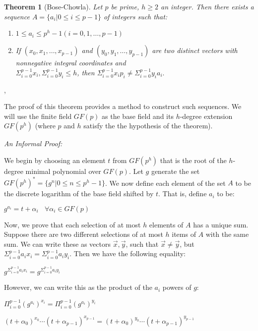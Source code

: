 \documentclass[12pt,a4paper,titlepage]{article}
\begin{document}
\newtheorem{theorem}{Theorem}[section]
\begin{theorem}[Bose-Chowla]
	Let $p$ be prime, $h \ge 2$ an integer. Then there exists a sequence $A = \{ a_i | 0 \le i \le p-1 \} $ of integers such that: 
	\begin{enumerate}
		\item $ 1 \le a_i \le p^h - 1   (i = 0, 1, \dots, p-1)$
		\item If $(x_0, x_1, \dots, x_{p-1})$ and $ ( y_0,y_1, \dots, y_{p-1} )$ are two distinct vectors with nonnegative integral coordinates and \\ 
			$ \Sigma_{i=0}^{p-1} x_i , \Sigma_{i=0}^{p-1} y_i \le h$, then  $\Sigma_{i=0}^{p-1} x_i p_i \ne \Sigma_{i=0}^{p-1} y_i a_i .$
	\end{enumerate}
\end{theorem}
\cite{Chor84:1}, \cite{Bose:2}
\par The proof of this theorem provides a method to construct such sequences.   We will use the finite field $GF(p)$ as the base field and its $h$-degree extension $GF(p^h)$ (where $p$ and $h$ satisfy the the hypothesis of the theorem).

\textit{An Informal Proof: }

\par We begin by choosing an element $t$ from $GF(p^h)$ that is the root of the $h$-degree minimal polynomial over $GF(p)$. Let $g$ generate the set $GF(p^h)^* = \{g^n | 0 \le n \le p^h - 1 \}$. We now define each element of the set $A$ to be the discrete logarithm of the base field shifted by $t$. That is, define $a_i$ to be: \\ \centerline{$ g^{a_i} = t + \alpha_i \ \  \ \  \forall\alpha_i \in GF(p)$} Now, we prove that each selection of at most $h$ elements of $A$ has a unique sum. Suppose there are two different selections of at most $h$ items of $A$ with the same sum. We can write these as vectors $\vec{x},\vec{y}$, such that $\vec{x} \ne \vec{y}$,  but $\Sigma_{i=0}^{p-1} a_i x_i = \Sigma_{i = 0}^{p - 1} a_i y_i.$  Then we have the following equality:\\ \centerline{ $ g^{ \Sigma_{i=0}^{p-1} a_i x_i   } =   g^{\Sigma_{i=0}^{p-1} a_i y_i  } $ } 
However, we can write this as the product of the $a_i $ powers of $g$:\\

\centerline{ $\Pi_{i = 0}^{p - 1} (g^{a_i} )^{x_i}  = \Pi_{i = 0}^{p - 1} (g^{a_i} )^{y_i} $ }
\centerline{ $(t+\alpha_0 )^{x_0} \cdots (t + \alpha_{p-1})^{x_{p-1}}  = (t+\alpha_0 )^{y_0} \cdots (t + \alpha_{p-1})^{y_{p-1}}  $}
\end{document}
